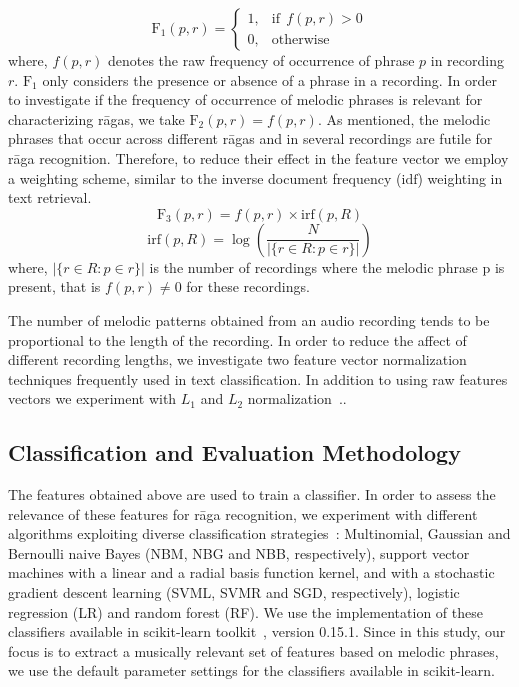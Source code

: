 \begin{equation}
\mathrm{F_1}(p,r)= 
\begin{cases}
1				,& \text{if}~~f(p,r) > 0\\
0,              & \text{otherwise}
\end{cases}
\end{equation}
where, $f(p,r)$ denotes the raw frequency of occurrence of phrase $p$ in recording $r$. $\mathrm{F_1}$ only considers the presence or absence of a phrase in a recording. In order to investigate if the frequency of occurrence of melodic phrases is relevant for characterizing r\={a}gas, we take $\mathrm{F_2}(p,r) = f(p,r)$. As mentioned, the melodic phrases that occur across different r\={a}gas and in several recordings are futile for r\={a}ga recognition. Therefore, to reduce their effect in the feature vector we employ a weighting scheme, similar to the inverse document frequency ($\mathrm{idf}$) weighting in text retrieval.
\begin{equation}
\mathrm{F_3}(p,r) = f(p,r) \times \mathrm{irf}(p,R)
\end{equation}
\begin{equation}
\mathrm{irf}(p,R) = \log \left( \frac{N}{ |\lbrace r \in R: p \in r \rbrace|} \right)
\end{equation}
where, $|\lbrace r \in R: p \in r \rbrace|$ is the number of recordings where the melodic phrase p is present, that is $f(p,r)\neq 0$ for these recordings. 

The number of melodic patterns obtained from an audio recording tends to be proportional to the length of the recording. In order to reduce the affect of different recording lengths, we investigate two feature vector normalization techniques frequently used in text classification. In addition to using raw features vectors we experiment with $L_1$ and $L_2$ normalization~\cite{leopold2002text}.. 


\subsection{Classification and Evaluation Methodology}
\label{sec:classification_based_raga_recognition}

The features obtained above are used to train a classifier. In order to assess the relevance of these features for r\={a}ga recognition, we experiment with different algorithms exploiting diverse classification strategies~\cite{Hastie09BOOK}: Multinomial, Gaussian and Bernoulli naive Bayes (NBM, NBG and NBB, respectively), support vector machines with a linear and a radial basis function kernel, and with a stochastic gradient descent learning (SVML, SVMR and SGD, respectively), logistic regression (LR) and random forest (RF). We use the implementation of these classifiers available in scikit-learn toolkit~\cite{scikitlearn}, version 0.15.1. Since in this study, our focus is to extract a musically relevant set of features based on melodic phrases, we use the  default parameter settings for the classifiers available in scikit-learn. 

